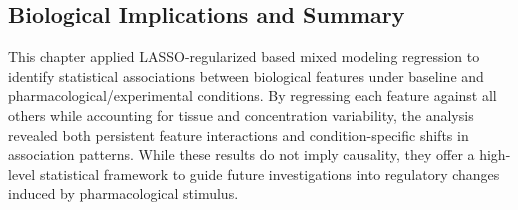 \documentclass{report}
\begin{document}
    


    \subsection{Biological Implications and Summary}
    This chapter applied LASSO-regularized based mixed modeling regression to identify statistical associations between biological features under baseline and pharmacological/experimental conditions. By regressing each feature against all others while accounting for tissue and concentration variability, the analysis revealed both persistent feature interactions and condition-specific shifts in association patterns. While these results do not imply causality, they offer a high-level statistical framework to guide future investigations into regulatory changes induced by pharmacological stimulus.
    
\end{document}
